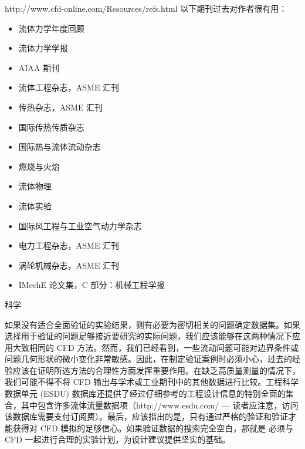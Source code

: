 \documentclass[11pt,a4paper,openany,fontset=none]{ctexbook}
\begin{document}
http://www.cfd-online.com/Resources/refs.html
以下期刊过去对作者很有用：

\begin{itemize}

\item 流体力学年度回顾

\item 流体力学学报

\item AIAA 期刊

\item 流体工程杂志，ASME 汇刊

\item 传热杂志，ASME 汇刊

\item 国际传热传质杂志

\item 国际热与流体流动杂志

\item 燃烧与火焰

\item 流体物理

\item 流体实验

\item 国际风工程与工业空气动力学杂志

\item 电力工程杂志，ASME 汇刊

\item 涡轮机械杂志，ASME 汇刊

\item IMechE 论文集，C 部分：机械工程学报

\end{itemize}

科学

如果没有适合全面验证的实验结果，则有必要为密切相关的问题确定数据集。如果选择用于验证的问题足够接近要研究的实际问题，我们应该能够在这两种情况下应用大致相同的 CFD 方法。然而，我们已经看到，一些流动问题可能对边界条件或问题几何形状的微小变化非常敏感。因此，在制定验证案例时必须小心，过去的经验应该在证明所选方法的合理性方面发挥重要作用。在缺乏高质量测量的情况下，我们可能不得不将 CFD 输出与学术或工业期刊中的其他数据进行比较。工程科学数据单元 (ESDU) 数据库还提供了经过仔细参考的工程设计信息的特别全面的集合，其中包含许多流体流量数据项（http://www.esdu.com/ — 读者应注意，访问该数据库需要支付订阅费）。最后，应该指出的是，只有通过严格的验证和验证才能获得对 CFD 模拟的足够信心。如果验证数据的搜索完全空白，那就是
必须与 CFD 一起进行合理的实验计划，为设计建议提供坚实的基础。
\end{document}
